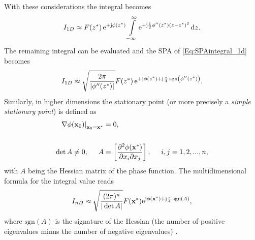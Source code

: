With these considerations the integral becomes
\begin{align}
I_{1D} \approx F(z^*)\,\mathrm{e}^{+\mathrm{j}\phi(z^*)} 
\int\limits_{-\infty}^{\infty} \mathrm{e}^{+\mathrm{j} \frac{1}{2}\phi''(z^*)(z-z^*)^2} \, \mathrm{d} z.
\end{align}
The remaining integral can be evaluated and the SPA of \eqref{Eq:SPAintegral_1d} becomes \cite[Ch.\ 2.8]{Blenstein1975}
\begin{equation}
\label{Eq:SPAResult}
I_{1D} \approx \sqrt{\frac{2\pi}{| \phi''(z^*) |}} F(z^*) \, \mathrm{e}^{+\mathrm{j} \phi(z^*) + \mathrm{j} \frac{\pi}{4}\,\mathrm{sgn}\left(  \phi''(z^*) \right)}.
\end{equation}
\vspace{3mm}
Similarly, in higher dimensions the stationary point (or more precisely a \emph{simple stationary point}) is defined as
\begin{align}
\label{Eq:ndim_stat_point}
\begin{split}
\left.
\nabla \phi(\vxo)\right|_{\vxo = \vx^*} &= 0,
\\ \vspace{3mm} \\
\det A \neq 0,
\hspace{5mm} 
A &= \left[
\frac{\partial^2 \phi(\vx^*)}{\partial x_i \partial x_j} 
\right],
\hspace{5mm}
i,j = 1,2,...,n,
\end{split}
\end{align}
with $A$ being the Hessian matrix of the phase function.
The multidimensional formula for the integral value reads
\begin{equation}
\label{Eq:SPAResult_nd}
I_{nD} \approx \sqrt{\frac{(2\pi)^n}{|\det A|}} F(\mathbf{x}^*) \mathrm{e}^{\mathrm{j} \phi(\mathbf{x}^*) + \mathrm{j} \frac{\pi}{4}\,\mathrm{sgn}\left( A \right)},
\end{equation}
where $\mathrm{sgn}\left( A \right)$ is the signature of the Hessian (the number of positive eigenvalues minus the number of negative eigenvalues) \cite{Bleistein2000}.

